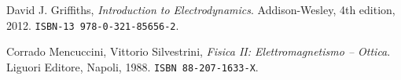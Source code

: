 \documentclass[a4paper,oneside]{article}
\begin{document}
\begin{thebibliography}{9}

  David J. Griffiths,
  \emph{Introduction to Electrodynamics}.
  Addison-Wesley, 
  4th edition,
  2012.
  \texttt{ISBN-13 978-0-321-85656-2}.

  Corrado Mencuccini, Vittorio Silvestrini,
  \emph{Fisica II: Elettromagnetismo -- Ottica}.
  Liguori Editore, Napoli,
  1988.
  \texttt{ISBN 88-207-1633-X}.

\end{thebibliography}
\end{document}
